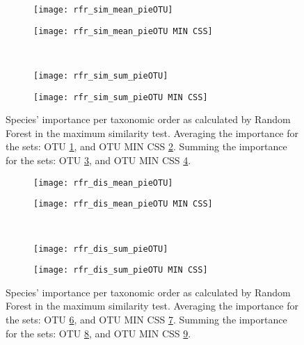\begin{figure}[h]
	\centering
	\begin{subfigure}{0.45\textwidth}
		\texttt{[image: rfr\_sim\_mean\_pieOTU]}
		\caption{}
		\label{fig:simotumean}
	\end{subfigure}
	\begin{subfigure}{0.45\textwidth}
		\texttt{[image: rfr\_sim\_mean\_pieOTU MIN CSS]}
		\caption{}
		\label{fig:simotumincssmean}
	\end{subfigure}\\
	\begin{subfigure}{0.45\textwidth}
		\texttt{[image: rfr\_sim\_sum\_pieOTU]}
		\caption{}
		\label{fig:simotusum}
	\end{subfigure}
	\begin{subfigure}{0.45\textwidth}
		\texttt{[image: rfr\_sim\_sum\_pieOTU MIN CSS]}
		\caption{}
		\label{fig:simotumincsssum}
	\end{subfigure}
	\caption{Species' importance per taxonomic order as calculated by Random Forest in the maximum similarity test. Averaging the importance for the sets: OTU \ref{fig:simotumean}, and OTU MIN CSS \ref{fig:simotumincssmean}. Summing the importance for the sets: OTU \ref{fig:simotusum}, and OTU MIN CSS \ref{fig:simotumincsssum}.  }
	\label{fig:simpieappendix}
\end{figure}

\begin{figure}[h]
	\centering
	\begin{subfigure}{0.45\textwidth}
		\texttt{[image: rfr\_dis\_mean\_pieOTU]}
		\caption{}
		\label{fig:dissimotumean}
	\end{subfigure}	
	\begin{subfigure}{0.45\textwidth}
		\texttt{[image: rfr\_dis\_mean\_pieOTU MIN CSS]}
		\caption{}
		\label{fig:dissimotumincssmean}
	\end{subfigure}\\
	\begin{subfigure}{0.45\textwidth}
	\texttt{[image: rfr\_dis\_sum\_pieOTU]}
	\caption{}
	\label{fig:dissimotusum}
\end{subfigure}	
\begin{subfigure}{0.45\textwidth}
	\texttt{[image: rfr\_dis\_sum\_pieOTU MIN CSS]}
	\caption{}
	\label{fig:dissimotumincsssum}
\end{subfigure}
	\caption{Species' importance per taxonomic order as calculated by Random Forest in the maximum similarity test. Averaging the importance for the sets: OTU \ref{fig:dissimotumean}, and OTU MIN CSS \ref{fig:dissimotumincssmean}. Summing the importance for the sets: OTU \ref{fig:dissimotusum}, and OTU MIN CSS \ref{fig:dissimotumincsssum}. }
	\label{fig:dispieappendix}
\end{figure}
%
